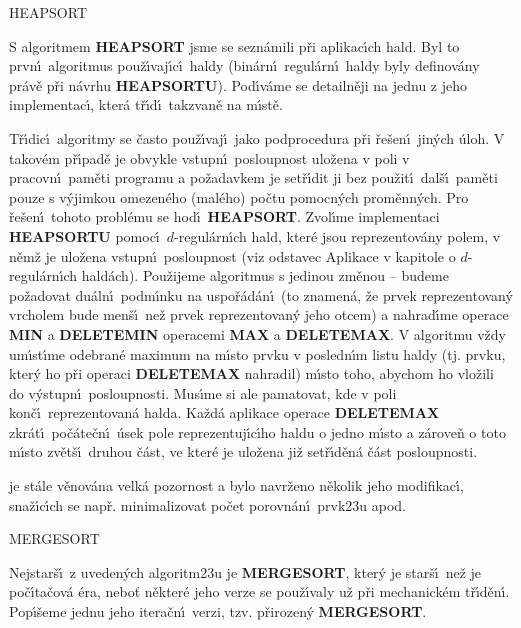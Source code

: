 \documentclass[a4paper,12pt]{article}
\begin{document}
\head
HEAPSORT
\endhead

\flushpar S algoritmem {\bf HEAPSORT} jsme se sezn\'amili p\v ri 
aplikac\'\i ch hald.  Byl to prvn\'\i\ algoritmus pou\v z\'\i vaj\'\i c\'\i\ haldy 
(bin\'arn\'\i\ regul\'ar\-n\'\i\ haldy byly definov\'any pr\'av\v e p\v ri n\'avrhu 
{\bf HEAP\-SORTU}).  Pod\'\i v\'ame se detailn\v eji na jednu z jeho 
implementac\'\i , kter\'a t\v r\'\i d\'\i\ takzvan\v e na m\'\i st\v e. 
\medskip

\flushpar T\v r\'\i dic\'\i\ algoritmy se \v casto pou\v z\'\i vaj\'\i\ jako 
podprocedura p\v ri \v re\v sen\'\i\ jin\'ych \'uloh. V takov\'em p\v r\'\i pad\v e je 
obvykle vstupn\'\i\ posloupnost ulo\v zena v poli v pracovn\'\i\ 
pam\v eti programu a po\v za\-dav\-kem  je set\v r\'\i dit ji 
bez pou\v zit\'\i\ dal\v s\'\i\ 
pam\v eti pouze s v\'yjimkou omezen\'eho (mal\'eho) po\v ctu pomocn\'ych 
prom\v enn\'ych. Pro \v re\v sen\'\i\ tohoto probl\'emu se hod\'\i\ 
{\bf HEAPSORT}. Zvol\'\i me implementaci {\bf HEAPSORTU} pomoc\'\i\ 
$d$-regul\'arn\'\i ch hald, kter\'e jsou reprezentov\'any  
polem, v n\v em\v z je ulo\v zena vstupn\'\i\ posloupnost (viz odstavec 
Aplikace v kapitole o $d$-regul\'arn\'\i ch hald\'ach). Pou\v zijeme 
algoritmus s jedinou zm\v enou -- budeme po\v zadovat du\'aln\'\i\ 
podm\'\i nku na uspo\v r\'ad\'an\'\i\ (to znamen\'a, \v ze prvek reprezentovan\'y 
vrcholem bude men\v s\'\i\ ne\v z prvek reprezentovan\'y jeho 
otcem) a nahrad\'\i me operace {\bf MIN} a {\bf DELETEMIN }
operacemi {\bf MAX} a {\bf DELETEMAX}. V algoritmu v\v zdy um\'\i st\'\i me 
odebran\'e maximum na m\'\i sto prvku v posled\-n\'\i m listu 
haldy (tj. prvku, kter\'y ho p\v ri operaci {\bf DELETEMAX }
nahradil) m\'\i sto toho, abychom ho vlo\v zili 
do v\'ystupn\'\i\ posloupnosti. Mus\'\i me si ale 
pamatovat, kde v poli kon\v c\'\i\ reprezentovan\'a halda. Ka\v zd\'a 
aplikace operace {\bf DELETEMAX} zkr\'at\'\i\ po\v c\'ate\v cn\'\i\ \'usek pole 
reprezentuj\'\i c\'\i ho haldu o jedno m\'\i sto 
a z\'arove\v n o toto m\'\i sto zv\v et\v s\'\i\ druhou \v c\'ast, ve kter\'e je ulo\v zena ji\v z 
set\v r\'\i d\v en\'a \v c\'ast posloupnosti. 
\medskip

\flushpar {\bf HEAPSORTU} je st\'ale v\v enov\'ana velk\'a pozornost a 
bylo navr\v ze\-no n\v ekolik jeho modifikac\'\i , sna\v z\'\i c\'\i ch se 
nap\v r. minimalizovat po\v cet porovn\'an\'\i\ prvk\accent23u apod.
\bigskip

\head
MERGESORT
\endhead

\flushpar Nejstar\v s\'\i\ z uveden\'ych algoritm\accent23u je 
{\bf MERGESORT}, kter\'y je star\v s\'\i\ ne\v z je po\v c\'\i ta\v cov\'a \'era, 
nebo\v t n\v ekter\'e jeho 
verze se pou\v z\'\i valy u\v z p\v ri mecha\-nick\'em t\v r\'\i d\v en\'\i . Pop\'\i\v seme 
jednu jeho itera\v cn\'\i\ verzi, tzv. p\v rirozen\'y {\bf MERGESORT}. 
\bigskip
\end{document}
